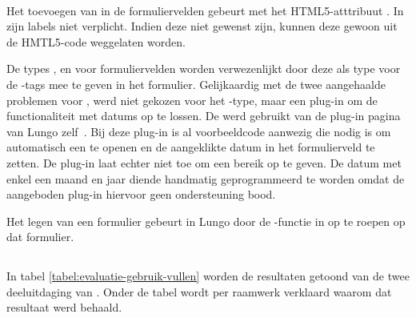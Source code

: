  
\paragraph{\lungo} 
Het toevoegen van  in de formuliervelden gebeurt met het HTML5-atttribuut .
In \lungo{} zijn labels niet verplicht.
Indien deze niet gewenst zijn, kunnen deze gewoon uit de HMTL5-code weggelaten worden.

De types ,  en  voor formuliervelden worden verwezenlijkt door deze als type voor de -tags mee te geven in het formulier.
Gelijkaardig met de twee aangehaalde problemen voor \jqm{}, werd niet gekozen voor het -type, maar een plug-in om de functionaliteit met datums op te lossen.
De  werd gebruikt van de plug-in pagina van Lungo zelf~\cite{TapQuo2013b}.
Bij deze plug-in is al voorbeeldcode aanwezig die nodig is om automatisch een  te openen en de aangeklikte datum in het formulierveld te zetten.
De plug-in laat echter niet toe om een bereik op te geven.
De datum met enkel een maand en jaar diende handmatig geprogrammeerd te worden omdat de aangeboden plug-in hiervoor geen ondersteuning bood.

Het legen van een formulier gebeurt in Lungo door de -functie in \js{} op te roepen op dat formulier.


\subsection{}
\label{sec:evaluatie-gebruik-vullen}

In tabel \ref{tabel:evaluatie-gebruik-vullen} worden de resultaten getoond van de twee deeluitdaging van .
Onder de tabel wordt per raamwerk verklaard waarom dat resultaat werd behaald.

\begin{table}[H]
\centering
{}
\caption{Gebruik voor }
\label{tabel:evaluatie-gebruik-vullen}
\end{table}

